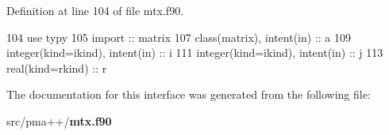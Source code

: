 Definition at line 104 of file mtx.\+f90.


\begin{DoxyCode}
104             \textcolor{keywordtype}{use }typy
105             \textcolor{keywordtype}{import }:: matrix
107             \textcolor{keywordtype}{class}(matrix), \textcolor{keywordtype}{intent(in)} :: a
109             \textcolor{keywordtype}{integer(kind=ikind)}, \textcolor{keywordtype}{intent(in)} :: i
111             \textcolor{keywordtype}{integer(kind=ikind)}, \textcolor{keywordtype}{intent(in)} :: j
113             \textcolor{keywordtype}{real(kind=rkind)} :: r
\end{DoxyCode}


The documentation for this interface was generated from the following file\+:\begin{DoxyCompactItemize}
\item 
src/pma++/{\bf mtx.\+f90}\end{DoxyCompactItemize}
